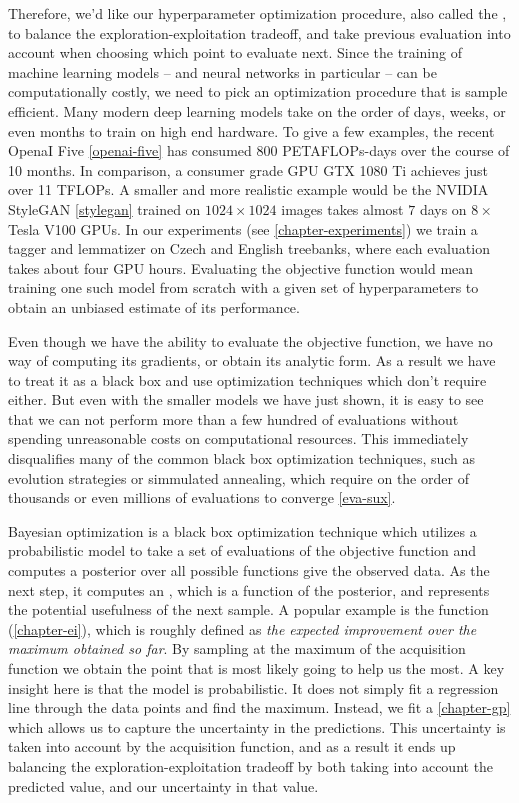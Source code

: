 Therefore, we'd like our hyperparameter optimization procedure, also called the
 , to balance the exploration-exploitation tradeoff, and take previous
evaluation into account when choosing which point to evaluate next. Since the
training of machine learning models -- and neural networks in particular -- can
be computationally costly, we need to pick an optimization procedure that is
sample efficient. Many modern deep learning models take on the order of days,
weeks, or even months to train on high end hardware. To give a few examples,
the recent OpenaI Five \ref{openai-five} has consumed $800$ PETAFLOPs-days over
the course of 10 months. In comparison, a consumer grade GPU GTX 1080 Ti
achieves just over 11 TFLOPs. A smaller and more realistic example would be the
NVIDIA StyleGAN \ref{stylegan} trained on $1024\times1024$ images takes almost
$7$ days on $8\times$ Tesla V100 GPUs. In our experiments (see
\ref{chapter-experiments}) we train a tagger and lemmatizer on Czech and
English treebanks, where each evaluation takes about four GPU hours. Evaluating
the objective function would mean training one such model from scratch with a
given set of hyperparameters to obtain an unbiased estimate of its performance.

Even though we have the ability to evaluate the objective function, we have no
way of computing its gradients, or obtain its analytic form. As a result we
have to treat it as a black box and use optimization techniques which don't
require either. But even with the smaller models we have just shown, it is easy
to see that we can not perform more than a few hundred of evaluations without
spending unreasonable costs on computational resources. This immediately
disqualifies many of the common black box optimization techniques, such as
evolution strategies or simmulated annealing, which require on the order of
thousands or even millions of evaluations to converge \ref{eva-sux}.

Bayesian optimization is a black box optimization technique which utilizes a
probabilistic model to take a set of evaluations of the objective function and
computes a posterior over all possible functions give the observed data.  As
the next step, it computes an , which is a
function of the posterior, and represents the potential usefulness of the next
sample. A popular example is the  function
(\ref{chapter-ei}), which is roughly defined as \emph{the expected improvement
over the maximum obtained so far}. By sampling at the maximum of the
acquisition function we obtain the point that is most likely going to help us
the most. A key insight here is that the model is probabilistic. It does not
simply fit a regression line through the data points and find the maximum.
Instead, we fit a  \ref{chapter-gp} which allows us
to capture the uncertainty in the predictions. This uncertainty is taken into
account by the acquisition function, and as a result it ends up balancing the
exploration-exploitation tradeoff by both taking into account the predicted
value, and our uncertainty in that value.

